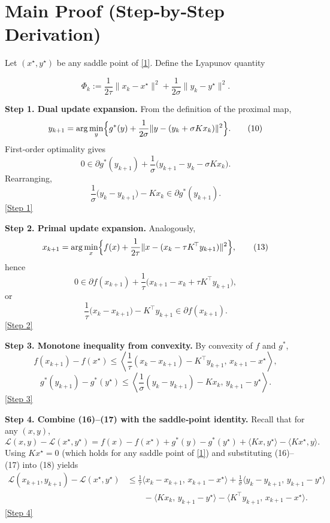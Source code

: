 \documentclass{article}
\begin{document}
\section*{Main Proof (Step‑by‑Step Derivation)}
Let $(x^{\star},y^{\star})$ be any saddle point of \eqref{1}.  
Define the Lyapunov quantity  

\[
\Phi_{k}:=
\frac{1}{2\tau}\|x_{k}-x^{\star}\|^{2}
+
\frac{1}{2\sigma}\|y_{k}-y^{\star}\|^{2}.
\tag{9}
\]

\noindent\textbf{Step 1. Dual update expansion.}  
From the definition of the proximal map,
\[
y_{k+1}= \arg\min_{y}\Bigl\{ g^{*}(y)+\frac{1}{2\sigma}\|y-(y_{k}+\sigma Kx_{k})\|^{2}\Bigr\}.
\tag{10}
\]
First‑order optimality gives
\[
0\in \partial g^{*}(y_{k+1})+\frac{1}{\sigma}\bigl(y_{k+1}-y_{k}-\sigma Kx_{k}\bigr).
\tag{11}
\]
Rearranging,
\[
\frac{1}{\sigma}\bigl(y_{k}-y_{k+1}\bigr)-Kx_{k}\in \partial g^{*}(y_{k+1}).
\tag{12}
\]
\noindent\underline{[Step 1]}

\medskip
\noindent\textbf{Step 2. Primal update expansion.}  
Analogously,
\[
x_{k+1}= \arg\min_{x}\Bigl\{ f(x)+\frac{1}{2\tau}\|x-(x_{k}-\tau K^{\!\top}y_{k+1})\|^{2}\Bigr\},
\tag{13}
\]
hence
\[
0\in \partial f(x_{k+1})+\frac{1}{\tau}\bigl(x_{k+1}-x_{k}+\tau K^{\!\top}y_{k+1}\bigr),
\tag{14}
\]
or
\[
\frac{1}{\tau}\bigl(x_{k}-x_{k+1}\bigr)-K^{\!\top}y_{k+1}\in \partial f(x_{k+1}).
\tag{15}
\]
\noindent\underline{[Step 2]}

\medskip
\noindent\textbf{Step 3. Monotone inequality from convexity.}  
By convexity of $f$ and $g^{*}$,
\[
f(x_{k+1})-f(x^{\star})\le
\left\langle \frac{1}{\tau}(x_{k}-x_{k+1})-K^{\!\top}y_{k+1},\, x_{k+1}-x^{\star}\right\rangle,
\tag{16}
\]
\[
g^{*}(y_{k+1})-g^{*}(y^{\star})\le
\left\langle \frac{1}{\sigma}(y_{k}-y_{k+1})-Kx_{k},\, y_{k+1}-y^{\star}\right\rangle .
\tag{17}
\]
\noindent\underline{[Step 3]}

\medskip
\noindent\textbf{Step 4. Combine (16)–(17) with the saddle‑point identity.}  
Recall that for any $(x,y)$,
\[
\mathcal L(x,y)-\mathcal L(x^{\star},y^{\star})
= f(x)-f(x^{\star}) + g^{*}(y)-g^{*}(y^{\star}) + \langle Kx, y^{\star}\rangle - \langle Kx^{\star},y\rangle .
\tag{18}
\]
Using $Kx^{\star}=0$ (which holds for any saddle point of \eqref{1}) and substituting (16)–(17) into (18) yields
\[
\begin{aligned}
\mathcal L(x_{k+1},y_{k+1})-\mathcal L(x^{\star},y^{\star})
&\le
\frac{1}{\tau}\langle x_{k}-x_{k+1},\,x_{k+1}-x^{\star}\rangle
+\frac{1}{\sigma}\langle y_{k}-y_{k+1},\,y_{k+1}-y^{\star}\rangle  \\[2mm]
&\qquad
- \langle Kx_{k},\,y_{k+1}-y^{\star}\rangle
- \langle K^{\!\top}y_{k+1},\,x_{k+1}-x^{\star}\rangle .
\end{aligned}
\tag{19}
\]
\noindent\underline{[Step 4]}
\end{document}
